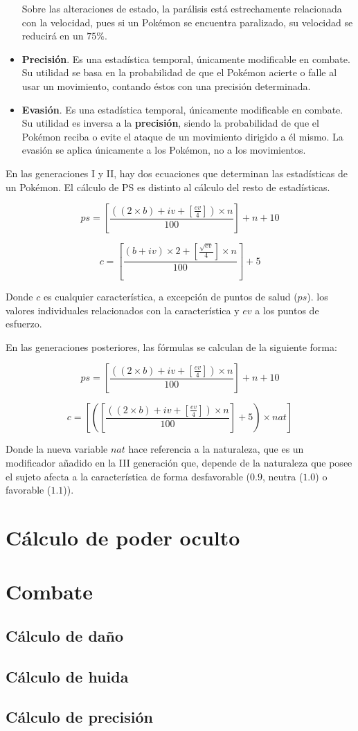 \documentclass[a4paper, 11pt, titlepage]{article}
\begin{document}
\begin{itemize}
        Sobre las alteraciones de estado, la parálisis está estrechamente relacionada con la velocidad, pues 
        si un Pokémon se encuentra paralizado, su velocidad se reducirá en un $75\%$.
        \item \textbf{Precisión}. Es una estadística temporal, únicamente modificable en combate. Su 
        utilidad se basa en la probabilidad de que el Pokémon acierte o falle al usar un movimiento, contando 
        éstos con una precisión determinada.
        \item \textbf{Evasión}. Es una estadística temporal, únicamente modificable en combate. Su
        utilidad es inversa a la \textbf{precisión}, siendo la probabilidad de que el Pokémon reciba o evite 
        el ataque de un movimiento dirigido a él mismo. La evasión se aplica únicamente a los Pokémon, no a los 
        movimientos.
    \end{itemize}

    En las generaciones I y II, hay dos ecuaciones que determinan las estadísticas 
    de un Pokémon. El cálculo de PS es distinto al cálculo del resto de estadísticas.

    \[
        ps = [\frac{((2 \times b) + iv + [\frac{ev}{4}]) \times n}{100}] + n + 10
    \]

    \[
        c = [\frac{(b + iv) \times 2 + [\frac{\sqrt{ev}}{4}] \times n}{100}] + 5    
    \]

    Donde $c$ es cualquier característica, a excepción de puntos de salud ($ps$).
    los valores individuales relacionados con la característica y $ev$ a los puntos 
    de esfuerzo.

    En las generaciones posteriores, las fórmulas se calculan de la siguiente forma:

    \[
        ps = [\frac{((2 \times b) + iv + [\frac{ev}{4}]) \times n}{100}] + n + 10    
    \]

    \[
        c = [([\frac{((2 \times b) + iv + [\frac{ev}{4}]) \times n}{100}] + 5) \times nat]    
    \]

    Donde la nueva variable $nat$ hace referencia a la naturaleza, que es un modificador 
    añadido en la III generación que, depende de la naturaleza que posee el sujeto afecta a 
    la característica de forma desfavorable ($0.9$, neutra ($1.0$) o favorable ($1.1$)).

\section{Cálculo de poder oculto}

\section{Combate}

    \subsection{Cálculo de daño}

    \subsection{Cálculo de huida}

    \subsection{Cálculo de precisión}
\end{document}
